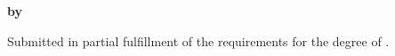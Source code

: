 \newcommand{\titleparsep}{\vspace{0.5in}}

\begin{titlepage}

\centering

\large

\MakeUppercase{\textbf{\thesisTitle}}

\titleparsep

\textbf{by}

\titleparsep

\MakeUppercase{\textbf{\thesisAuthor}}

\titleparsep

Submitted in partial fulfillment of the requirements for the degree of \thesisDegree.

\titleparsep

\thesisDepartment

\titleparsep

\MakeUppercase{\textbf{\thesisInstitution}}

\titleparsep

\thesisGraduationDate
\end{titlepage}